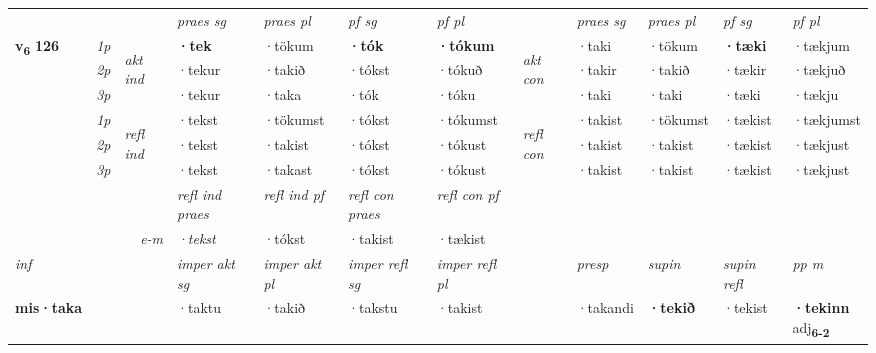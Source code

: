\begin{longtable}[l]{X>{\footnotesize\itshape}llXXXXlXXXX}
\midrule

 & &   & \textit{praes sg}  & \textit{praes pl}    & \textit{ pf sg} & \textit{pf pl} & & \textit{praes sg}  & \textit{praes pl}    & \textit{pf sg} & \textit{pf pl }  \\ \cmidrule{4-7} \cmidrule{9-12}
 \multirow{2}{*}{{{\textbf{v{\textsubscript{6}}} \Large{\textbf{126}}}}}  & 1p & \multirow{3}{*}{\begin{turn}{90}\textit{akt ind}\end{turn}} & \textbf{·tek} & ·tökum & \textbf{·tók} & \textbf{·tókum} & \multirow{3}{*}{\begin{turn}{90}\textit{akt con}\end{turn}} &·taki & ·tökum & \textbf{·tæki} & ·tækjum\\*
 & 2p &  &  ·tekur  & ·takið & ·tókst & ·tókuð & & ·takir & ·takið & ·tækir & ·tækjuð \\*
 & 3p &  & ·tekur & ·taka & ·tók & ·tóku & & ·taki & ·taki& ·tæki & ·tækju \\*
\cmidrule{4-7} \cmidrule{9-12}
 & 1p & \multirow{3}{*}{\begin{turn}{90}\textit{refl ind}\end{turn}}  & ·tekst & ·tökumst & ·tókst & ·tókumst & \multirow{3}{*}{\begin{turn}{90}\textit{refl con}\end{turn}}  &·takist & ·tökumst & ·tækist & ·tækjumst \\*
 & 2p &  & ·tekst & ·takist & ·tókst & ·tókust & &·takist & ·takist & ·tækist & ·tækjust \\*
 & 3p  & & ·tekst & ·takast & ·tókst & ·tókust & & ·takist & ·takist& ·tækist & ·tækjust \\*
\cmidrule{4-7} \cmidrule{9-12}

 & && \textit{refl ind praes} & \textit{refl ind pf} & \textit{refl con praes} & \textit{refl con pf} \\*
\multicolumn{3}{r}{\textit{e-m}}& ·tekst & ·tókst & ·takist & ·tækist \\*

\cmidrule{4-7}
   {\textit{inf}} & &  & \textit{imper akt sg} & \textit{imper akt pl} & \textit{imper refl sg} & \textit{imper refl pl} && \textit{presp} & \textit{supin} & \textit{supin refl} & \textit{pp m} \\*
  {\textbf{mis\allowbreak ·taka}} & && ·taktu  & ·takið & ·takstu & ·takist && ·takandi &  \textbf{·tekið} & ·tekist & \specialcell{\textbf{·tekinn} \\ adj\textbf{\textsubscript{6-2}}} \\*


\end{longtable}
